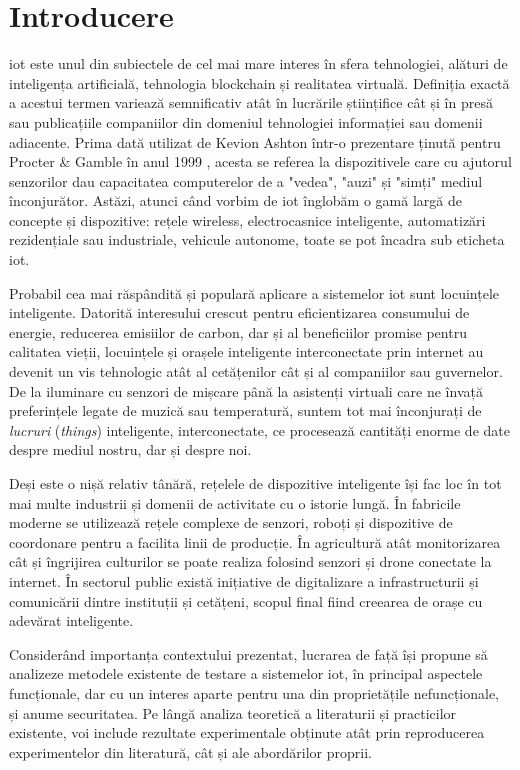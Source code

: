 \chapter{Introducere}

\acrlong{iot} este unul din subiectele de cel mai mare interes în sfera tehnologiei,
alături de inteligența artificială, tehnologia blockchain și realitatea virtuală. 
Definiția exactă a acestui termen variează semnificativ atât în lucrările
științifice cât și în presă sau publicațiile companiilor din domeniul tehnologiei informației sau domenii adiacente. Prima dată utilizat de Kevion Ashton într-o prezentare ținută pentru Procter \& Gamble în anul 1999 \cite{ashton_2009}, acesta se referea la dispozitivele care cu ajutorul senzorilor dau capacitatea computerelor de a "vedea", "auzi" și "simți" mediul înconjurător. Astăzi, atunci când vorbim de \acrshort{iot} înglobăm o gamă largă de concepte și dispozitive: rețele wireless, electrocasnice inteligente, automatizări rezidențiale sau industriale, vehicule autonome, toate se pot încadra sub eticheta \acrshort{iot}.

Probabil cea mai răspândită și populară aplicare a sistemelor \acrshort{iot} sunt locuințele inteligente. Datorită interesului crescut pentru eficientizarea consumului de energie, reducerea emisiilor de carbon, dar și al beneficiilor promise pentru calitatea vieții, locuințele și orașele inteligente interconectate prin internet au devenit un vis tehnologic atât al cetățenilor cât și al companiilor sau guvernelor. De la iluminare cu senzori de mișcare până la asistenți virtuali care ne învață preferințele legate de muzică sau temperatură, suntem tot mai înconjurați de \textit{lucruri} (\textit{things}) inteligente, interconectate, ce procesează cantități enorme de date despre mediul nostru, dar și despre noi. 

Deși este o nișă relativ tânără, rețelele de dispozitive inteligente își fac loc în tot mai multe industrii și domenii de activitate cu o istorie lungă. În fabricile moderne se utilizează rețele complexe de senzori, roboți și dispozitive de coordonare pentru a facilita linii de producție. În agricultură atât monitorizarea cât și îngrijirea culturilor se poate realiza folosind senzori și drone conectate la internet. În sectorul public există inițiative de digitalizare a infrastructurii și comunicării dintre instituții și cetățeni, scopul final fiind creearea de orașe cu adevărat inteligente. 

Considerând importanța contextului prezentat, lucrarea de față își propune să analizeze metodele existente de testare a sistemelor \acrshort{iot}, în principal aspectele funcționale, dar cu un interes aparte pentru una din proprietățile nefuncționale, și anume securitatea. Pe lângă analiza teoretică a literaturii și practicilor existente, voi include rezultate experimentale obținute atât prin reproducerea experimentelor din literatură, cât și ale abordărilor proprii.

